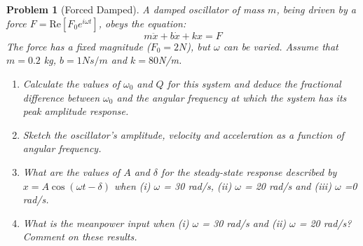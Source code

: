 \documentclass[a4paper]{article}
\theoremstyle{new}
\newtheorem{qns}{Problem}[section]
\begin{document}
\begin{qns}[Forced Damped]
A damped oscillator of mass $m$, being driven by a force $F =\text{Re}[F_0e^{i\omega t}]$, obeys the equation:
$$m\ddot{x}+ b\dot{x} + kx = F$$
The force has a fixed magnitude ($F_0 = 2N$), but $\omega$ can be varied. Assume that $m = 0.2$ kg, $b =1Ns/m$ and $k = 80$N/m.
\begin{enumerate}[label=(\alph*)]
    \item Calculate the values of $\omega_0$ and $Q$ for this system and deduce the fractional difference between $\omega_0$ and the angular frequency at which the system has its peak amplitude response.
    \item Sketch the oscillator’s amplitude, velocity and acceleration as a function of angular frequency.
    \item What are the values of $A$ and $\delta$ for the steady-state response described by $x=A\cos(\omega t-\delta)$ when (i) $\omega$ = 30 rad/s, (ii) $\omega$ = 20 rad/s and (iii) $\omega$ =0 rad/s.
    \item What is the meanpower input when (i) $\omega$ = 30 rad/s and (ii) $\omega$ = 20 rad/s? Comment on these results.
\end{enumerate}
\end{qns}
\end{document}

